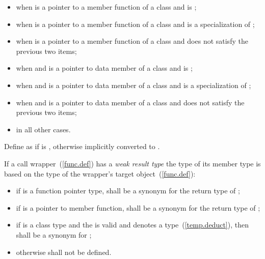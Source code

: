 \begin{itemize}
\item {} when  is a pointer to a
member function of a class 
and  is ;

\item {} when  is a pointer to a
member function of a class 
and  is a specialization of ;

\item {} when  is a pointer to a
member function of a class 
and  does not satisfy the previous two items;

\item {} when  and  is a pointer to
data member of a class 
and  is ;
    
\item {} when  and  is a pointer to
data member of a class 
and  is a specialization of ;

\item {} when  and  is a pointer to
data member of a class 
and  does not satisfy the previous two items;

\item {} in all other cases.
\end{itemize}

\pnum
{}%
Define  as
if  is \cv{} , otherwise
 implicitly converted
to .

\pnum
{}%
%
%
If a call wrapper~(\ref{func.def}) has a \textit{weak result type}
the type of its member type  is based on the
type  of the wrapper's target object~(\ref{func.def}):
\begin{itemize}
\item
if  is a function pointer type,
 shall be a synonym for the return type of ;

\item
if  is a pointer to member function, 
shall be a synonym for the return type of ;

\item
if  is a class type and the  
is valid and denotes a type~(\ref{temp.deduct}),
then  shall be a synonym for ;

\item
otherwise  shall not be defined.
\end{itemize}

